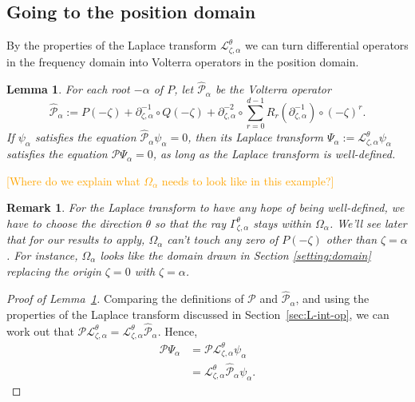 \documentclass{article}
\theoremstyle{plain}
\newtheorem{lemma}{Lemma}
\newtheorem{rmk}{Remark}
\newcommand{\laplace}{\mathcal{L}}
\newcommand{\fracderiv}[3]{\partial^{#1}_{#2, #3}}
\newcommand{\domain}{\Omega}
\begin{document}
\subsection{Going to the position domain}
By the properties of the Laplace transform $\laplace_{\zeta,\alpha}^{\theta}$ we can turn differential operators in the frequency domain into Volterra operators in the position domain. 
\begin{lemma}\label{lem:use-dict}
For each root $-\alpha$ of $P$, let $\hat{\mathcal{P}}_{\alpha}$ be the Volterra operator 
\[ \hat{\mathcal{P}}_\alpha:=P(-\zeta)+\partial_{\zeta,\alpha}^{-1}\circ Q(-\zeta)+\partial_{\zeta,\alpha}^{-2}\circ\sum_{r=0}^{d-1}R_r(\partial_{\zeta,\alpha}^{-1})\circ (-\zeta)^r. \]
If $\psi_\alpha$ satisfies the equation $\hat{\mathcal{P}}_\alpha\psi_\alpha=0$, then its Laplace transform $\Psi_\alpha:=\laplace_{\zeta,\alpha}^{\theta}\psi_\alpha$ satisfies the equation $\mathcal{P}\Psi_\alpha=0$, as long as the Laplace transform is well-defined.
\end{lemma}
\textcolor{orange}{[Where do we explain what $\domain_\alpha$ needs to look like in this example?]}
\begin{rmk}
For the Laplace transform to have any hope of being well-defined, we have to choose the direction $\theta$ so that the ray $\Gamma_{\zeta, \alpha}^\theta$ stays within $\domain_\alpha$. We'll see later that for our results to apply, $\domain_\alpha$ can't touch any zero of $P(-\zeta)$ other than $\zeta = \alpha$. For instance, $\domain_\alpha$ looks like the domain drawn in Section \ref{setting:domain} replacing the origin $\zeta=0$ with $\zeta=\alpha$. 
\end{rmk}
\begin{proof}[Proof of Lemma~\ref{lem:use-dict}]
Comparing the definitions of $\mathcal{P}$ and $\hat{\mathcal{P}}_\alpha$, and using the properties of the Laplace transform discussed in Section~\ref{sec:L-int-op}, we can work out that $\mathcal{P} \laplace_{\zeta,\alpha}^\theta = \laplace_{\zeta,\alpha}^\theta \hat{\mathcal{P}}_\alpha$. Hence,
\begin{align*}
\mathcal{P}\Psi_\alpha & = \mathcal{P}\laplace_{\zeta,\alpha}^{\theta}\psi_\alpha\\
& = \laplace_{\zeta,\alpha}^{\theta}\hat{\mathcal{P}}_\alpha\psi_\alpha.
\end{align*}
\end{proof}
\end{document}
